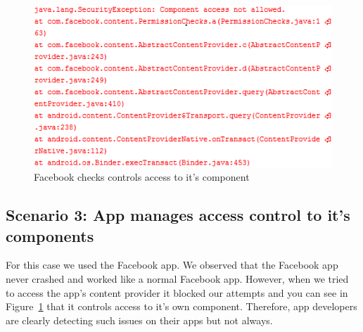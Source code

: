 \begin{figure}[tb]
\centering
	\includegraphics[width=\columnwidth]{images/FBProtections}
	\caption{Facebook checks controls access to it's component}
	\label{fig:FBProtections}
\end{figure}

\subsection{Scenario 3: App manages access control to it's components} For this case we used the Facebook app. We observed that the Facebook app never crashed and worked like a normal Facebook app. However, when we tried to access the app's content provider it blocked our attempts and you can see in Figure~\ref{fig:FBProtections} that it controls access to it's own component. Therefore, app developers are clearly detecting such issues on their apps but not always.

